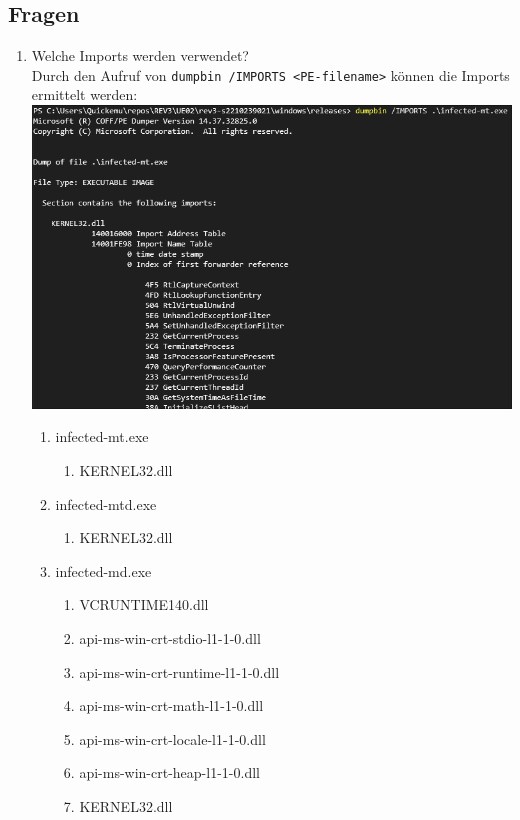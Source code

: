\documentclass{article}
\begin{document}
	\subsection*{Fragen}
	\begin{enumerate}
		\item Welche Imports werden verwendet?\\
		Durch den Aufruf von \texttt{dumpbin /IMPORTS <PE-filename>} können die Imports ermittelt werden:\\
		\includegraphics[width=1\linewidth]{pictures/1. example imports}
		\begin{enumerate}
			\item infected-mt.exe
			\begin{enumerate}
				\item KERNEL32.dll
			\end{enumerate}
			\item infected-mtd.exe
			\begin{enumerate}
				\item KERNEL32.dll
			\end{enumerate}
			\item infected-md.exe
			\begin{enumerate}
				\item VCRUNTIME140.dll
				\item api-ms-win-crt-stdio-l1-1-0.dll
				\item api-ms-win-crt-runtime-l1-1-0.dll
				\item api-ms-win-crt-math-l1-1-0.dll
				\item api-ms-win-crt-locale-l1-1-0.dll
				\item api-ms-win-crt-heap-l1-1-0.dll
				\item KERNEL32.dll
			\end{enumerate}

\end{enumerate}
\end{enumerate}
\end{document}
